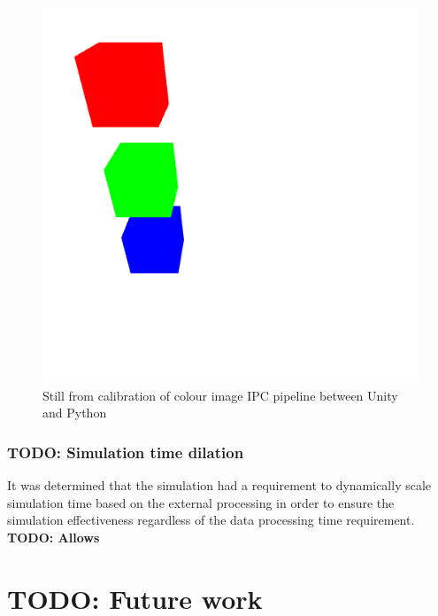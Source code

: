 \documentclass[]{aiaa-tc}%
\begin{document}
\begin{figure}[htb]%
 \includegraphics{unity_calibration.png}
 \caption{Still from calibration of colour image IPC pipeline between Unity and Python}
 \label{f:unity_calibration}
\end{figure}


\subsubsection{TODO: Simulation time dilation}\label{sect:timedilation}

It was determined that the simulation had a requirement to dynamically scale simulation time based on the external processing in order to ensure the simulation effectiveness regardless of the data processing time requirement. \textbf{TODO: Allows }



\section{TODO: Future work}
\end{document}
